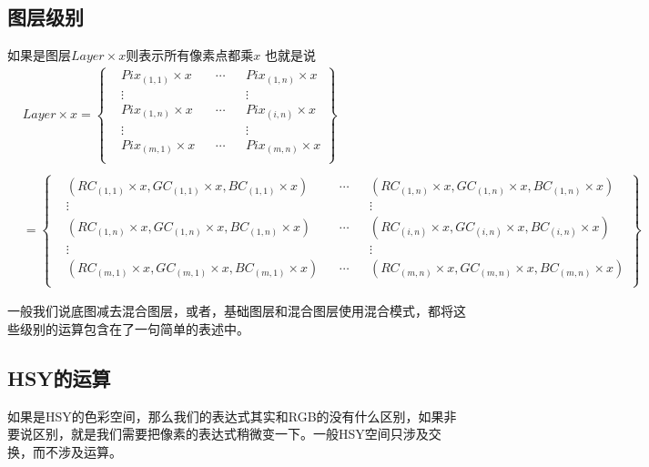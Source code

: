 \subsection{ 图层级别}
如果是图层$Layer\times x$则表示所有像素点都乘$x$
也就是说
\begin{equation}\begin{aligned}
&	Layer\times x=\left\{ \begin{aligned}     &Pix_{(1,1)}\times x&&\cdots&&Pix_{(1,n)}\times x\\&\vdots && &&\vdots\\  &Pix_{(1,n)}\times x &&\cdots&&Pix_{(i,n)}\times x\\&\vdots && &&\vdots\\  &Pix_{(m,1)}\times x &&\cdots&&Pix_{(m,n)}\times x\\  \end{aligned}\right\}\\\\&=\left\{ \begin{aligned}     &(RC_{(1,1)}\times x,GC_{(1,1)}\times x,BC_{(1,1)}\times x)&&\cdots&&(RC_{(1,n)}\times x,GC_{(1,n)}\times x,BC_{(1,n)}\times x)\\&\vdots && &&\vdots\\  &(RC_{(1,n)}\times x,GC_{(1,n)}\times x,BC_{(1,n)}\times x) &&\cdots&&(RC_{(i,n)}\times x,GC_{(i,n)}\times x,BC_{(i,n)}\times x)\\&\vdots && &&\vdots\\  &(RC_{(m,1)}\times x,GC_{(m,1)}\times x,BC_{(m,1)}\times x) &&\cdots&&(RC_{(m,n)}\times x,GC_{(m,n)}\times x,BC_{(m,n)}\times x)\\  \end{aligned}\right\}
\end{aligned}\end{equation}

\begin{notice}
	\item 一般我们说底图减去混合图层，或者，基础图层和混合图层使用混合模式，都将这些级别的运算包含在了一句简单的表述中。
\end{notice} 
\subsection{HSY的运算}
如果是HSY的色彩空间，那么我们的表达式其实和RGB的没有什么区别，如果非要说区别，就是我们需要把像素的表达式稍微变一下。一般HSY空间只涉及交换，而不涉及运算。
